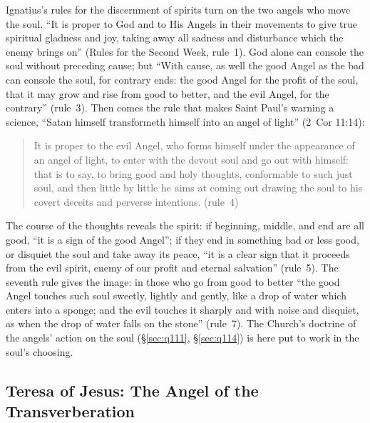 Ignatius's rules for the discernment of spirits turn on the two angels who
move the soul. ``It is proper to God and to His Angels in their movements to
give true spiritual gladness and joy, taking away all sadness and
disturbance which the enemy brings on'' (Rules for the Second Week,
rule~1). God alone can console the soul without preceding cause; but ``With
cause, as well the good Angel as the bad can console the soul, for contrary
ends: the good Angel for the profit of the soul, that it may grow and rise
from good to better, and the evil Angel, for the contrary'' (rule~3). Then
comes the rule that makes Saint Paul's warning a science, ``Satan himself
transformeth himself into an angel of light'' (2~Cor 11:14):
\begin{quote}
It is proper to the evil Angel, who forms himself under the appearance of
an angel of light, to enter with the devout soul and go out with himself:
that is to say, to bring good and holy thoughts, conformable to such just
soul, and then little by little he aims at coming out drawing the soul to
his covert deceits and perverse intentions. (rule~4)
\end{quote}
The course of the thoughts reveals the spirit: if beginning, middle, and end
are all good, ``it is a sign of the good Angel''; if they end in something
bad or less good, or disquiet the soul and take away its peace, ``it is a
clear sign that it proceeds from the evil spirit, enemy of our profit and
eternal salvation'' (rule~5). The seventh rule gives the image: in those who go from good to better
``the good Angel touches such soul sweetly, lightly and gently, like a drop
of water which enters into a sponge; and the evil touches it sharply and
with noise and disquiet, as when the drop of water falls on the stone''
(rule~7). The Church's doctrine of the angels' action on the soul
(\S\ref{sec:q111}, \S\ref{sec:q114}) is here put to work in the soul's
choosing.

\sectionguard\subsection{Teresa of Jesus: The Angel of the
Transverberation}\label{sec:sa-teresa}

